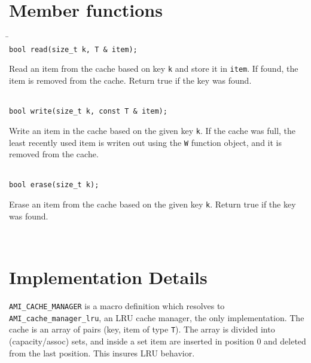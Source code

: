 \section{Member functions}
   \begin{tabbing}
   \hspace*{.3in} \= \hspace{.5in} \= \\ 

   \> {\tt  bool read(size\_t k, T \& item);}\\ 
   \>\>\parbox[t]{5.5in}{Read an item from the cache based on key {\tt k} and store it in {\tt item}. If found, the item is removed from the cache. Return true if the key was found.}\\[3mm]

   \> {\tt  bool write(size\_t k, const T \& item);}\\ 
   \>\>\parbox[t]{5.5in}{Write an item in the cache based on the given key {\tt k}. If the cache was full, the least recently used item is writen out using the {\tt W} function object, and it is removed from the cache.}\\[3mm]

   \> {\tt  bool erase(size\_t k);}\\ 
   \>\>\parbox[t]{5.5in}{Erase an item from the cache based on the given key {\tt k}. Return true if the key was found.}\\[3mm]
   \end{tabbing}

\section{Implementation Details}

{\tt AMI\_CACHE\_MANAGER} is a macro definition which resolves to {\tt
AMI\_cache\_manager\_lru}, an LRU cache manager, the only implementation.
The cache is an array of pairs (key, item of type {\tt T}). The array is
divided into (capacity/assoc) sets, and inside a set item are inserted in
position 0 and deleted from the last position. This insures LRU behavior.
